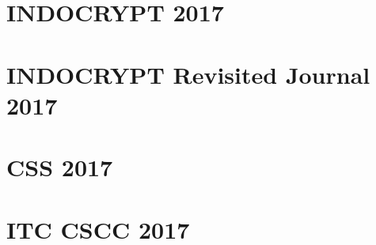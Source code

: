 \documentclass[
11pt, %
english, %
doublespacing %
liststotoc, %
toctotoc, %
parskip, %
headsepline, %
consistentlayout, %
]{MastersDoctoralThesis} %
\begin{document}
\chapter{INDOCRYPT 2017} 

\chapter{INDOCRYPT Revisited Journal 2017} 
 
\chapter{CSS 2017} 
 
\chapter{ITC CSCC 2017} 
 

% 




%
%
%


\printbibliography[heading=bibintoc]
\printindex 
{}
 
\end{document}
